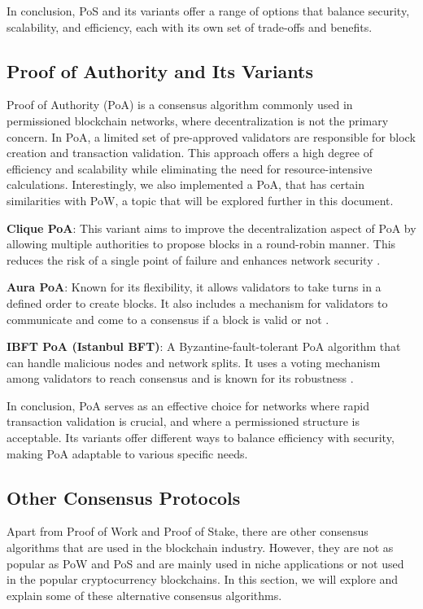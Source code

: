 In conclusion, PoS and its variants offer a range of options that balance security, scalability, and efficiency, each with its own set of trade-offs and benefits.

\subsection*{\textbf{Proof of Authority and Its Variants}}
Proof of Authority (PoA) is a consensus algorithm commonly used in permissioned blockchain networks, where decentralization is not the primary concern. In PoA, a limited set of pre-approved validators are responsible for block creation and transaction validation. This approach offers a high degree of efficiency and scalability while eliminating the need for resource-intensive calculations.
Interestingly, we also implemented a PoA, that has certain similarities with PoW, a topic that will be explored further in this document.

\textbf{Clique PoA}: This variant aims to improve the decentralization aspect of PoA by allowing multiple authorities to propose blocks in a round-robin manner. This reduces the risk of a single point of failure and enhances network security \cite{szilagyi2017clique}.

\textbf{Aura PoA}: Known for its flexibility, it allows validators to take turns in a defined order to create blocks. It also includes a mechanism for validators to communicate and come to a consensus if a block is valid or not \cite{aura_poa}.

\textbf{IBFT PoA (Istanbul BFT)}: A Byzantine-fault-tolerant PoA algorithm that can handle malicious nodes and network splits. It uses a voting mechanism among validators to reach consensus and is known for its robustness \cite{moniz2020istanbul}.

In conclusion, PoA serves as an effective choice for networks where rapid transaction validation is crucial, and where a permissioned structure is acceptable. Its variants offer different ways to balance efficiency with security, making PoA adaptable to various specific needs.


\subsection*{\textbf{Other Consensus Protocols}}

Apart from Proof of Work and Proof of Stake, there are other consensus algorithms that are used in the blockchain industry. However, they are not as popular as PoW and PoS and are mainly used in niche applications or not used in the popular cryptocurrency blockchains. In this section, we will explore and explain some of these alternative consensus algorithms.


